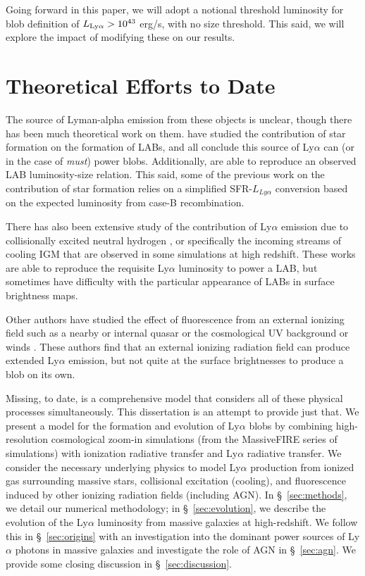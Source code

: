 Going forward in this paper, we will adopt a notional threshold luminosity for blob definition of $L_{\rm Ly\alpha} > 10^{43}$ erg/s, with no size threshold.
This said, we will explore the impact of modifying these on our results.

\section{Theoretical Efforts to Date}

The source of Lyman-alpha emission from these objects is unclear, though there has been much theoretical work on them. \citet{Furlanetto2005, Laursen2007, Cen2013, Geach2016, Gronke2017} have studied the contribution of star formation on the formation of LABs, and all conclude this source of Ly$\alpha$ can (or in the case of \citet{Cen2013} \emph{must}) power blobs.
Additionally, \citet{Cen2013} are able to reproduce an observed LAB luminosity-size relation.
This said, some of the previous work on the contribution of star formation relies on a simplified SFR-$L_{Ly\alpha}$ conversion based on the expected luminosity from case-B recombination.

There has also been extensive study of the contribution of Ly$\alpha$ emission due to collisionally excited neutral hydrogen \citep{Rosdahl2012, Fardal2001, Goerdt2010, Haiman2000, Faucher-Giguere2010}, or specifically the incoming streams of cooling IGM that are observed in some simulations at high redshift.
These works are able to reproduce the requisite Ly$\alpha$ luminosity to power a LAB, but sometimes have difficulty with the particular appearance of LABs in surface brightness maps.

Other authors have studied the effect of fluorescence from an external ionizing field such as a nearby or internal quasar \citep{Haiman2001} or the cosmological UV background or winds \citep{Furlanetto2005, Mas-Ribas2016}.
These authors find that an external ionizing radiation field can produce extended Ly$\alpha$ emission, but not quite at the surface brightnesses to produce a blob on its own.

Missing, to date, is a comprehensive model that considers all of these physical processes simultaneously.
This dissertation is an attempt to provide just that.
We present a model for the formation and evolution of Ly$\alpha$ blobs by combining high-resolution cosmological zoom-in simulations (from the MassiveFIRE series of simulations) with ionization radiative transfer and Ly$\alpha$ radiative transfer.
We consider the necessary underlying physics to model Ly$\alpha$ production from ionized gas surrounding massive stars, collisional excitation (cooling), and fluorescence induced by other ionizing radiation fields (including AGN).
In \S~\ref{sec:methods}, we detail our numerical methodology; in \S~\ref{sec:evolution}, we describe the evolution of the Ly$\alpha$ luminosity from massive galaxies at high-redshift.
We follow this in \S~\ref{sec:origins} with an investigation into the dominant power sources of Ly$\alpha$ photons in massive galaxies and investigate the role of AGN in \S~\ref{sec:agn}.
We provide some closing discussion in \S~\ref{sec:discussion}.

